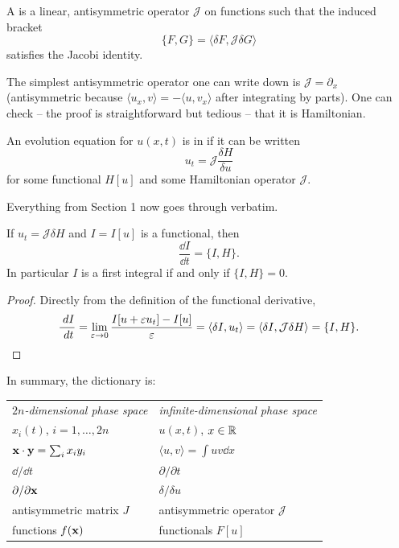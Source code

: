 \documentclass[a4paper]{scrartcl}
\newcommand{\ip}[2]{\langle #1, #2 \rangle}
\begin{document}
\begin{definition}
	A  is a linear, antisymmetric operator $\mathcal J$ on functions such that the induced bracket
	$$
	\{F,G\} = \ip{\delta F}{\mathcal J\delta G}
	$$
	satisfies the Jacobi identity.
\end{definition}

The simplest antisymmetric operator one can write down is $\mathcal J = \partial_x$ (antisymmetric because $\ip{u_x}{v} = -\ip{u}{v_x}$ after integrating by parts). One can check -- the proof is straightforward but tedious -- that it is Hamiltonian.

\begin{definition}
	An evolution equation for $u(x,t)$ is in  if it can be written
	$$
	u_t = \mathcal J\frac{\delta H}{\delta u}
	$$
	for some functional $H[u]$ and some Hamiltonian operator $\mathcal J$.
\end{definition}

Everything from Section 1 now goes through verbatim.

\begin{proposition}
	If $u_t = \mathcal J\delta H$ and $I = I[u]$ is a functional, then
	$$
	\frac{\dd I}{\dd t} = \{I, H\}.
	$$
	In particular $I$ is a first integral if and only if $\{I, H\} = 0$.
\end{proposition}
\begin{proof}
	Directly from the definition of the functional derivative,
	$$
	\frac{\dd I}{\dd t} = \lim_{\varepsilon\to0}\frac{I[u+\varepsilon u_t] - I[u]}{\varepsilon} = \ip{\delta I}{u_t} = \ip{\delta I}{\mathcal J\delta H} = \{I, H\}. \qedhere
	$$
\end{proof}

In summary, the dictionary is:
\begin{center}
	\begin{tabular}{ll}
		\emph{$2n$-dimensional phase space} & \emph{infinite-dimensional phase space}\\[2pt]
		$x_i(t)$, $i = 1,\dots,2n$ & $u(x,t)$, $x\in\mathbb{R}$\\
		$\mathbf{x}\cdot\mathbf{y} = \sum_ix_iy_i$ & $\ip{u}{v} = \int u v\dd x$\\
		$\dd/\dd t$ & $\partial/\partial t$\\
		$\partial/\partial\mathbf{x}$ & $\delta/\delta u$\\
		antisymmetric matrix $J$ & antisymmetric operator $\mathcal J$\\
		functions $f(\mathbf{x})$ & functionals $F[u]$\\
	\end{tabular}
\end{center}
\end{document}
